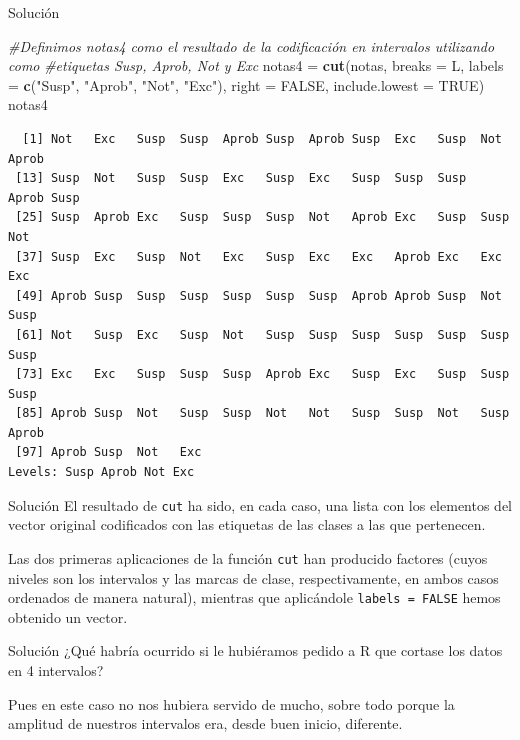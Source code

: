 \documentclass[
  ignorenonframetext,
]{beamer}
\newenvironment{Shaded}{\begin{snugshade}}{\end{snugshade}}
\newcommand{\AttributeTok}[1]{\textcolor[rgb]{0.13,0.29,0.53}{#1}}
\newcommand{\CommentTok}[1]{\textcolor[rgb]{0.56,0.35,0.01}{\textit{#1}}}
\newcommand{\ConstantTok}[1]{\textcolor[rgb]{0.56,0.35,0.01}{#1}}
\newcommand{\FunctionTok}[1]{\textcolor[rgb]{0.13,0.29,0.53}{\textbf{#1}}}
\newcommand{\NormalTok}[1]{#1}
\newcommand{\OtherTok}[1]{\textcolor[rgb]{0.56,0.35,0.01}{#1}}
\newcommand{\StringTok}[1]{\textcolor[rgb]{0.31,0.60,0.02}{#1}}
\begin{document}
\begin{frame}[fragile]{Solución}
\label{soluciuxf3n-20}
\begin{Shaded}
\begin{Highlighting}[]
\CommentTok{\#Definimos notas4 como el resultado de la codificación en intervalos utilizando como }
\CommentTok{\#etiquetas Susp, Aprob, Not y Exc}
\NormalTok{notas4 }\OtherTok{=} \FunctionTok{cut}\NormalTok{(notas, }\AttributeTok{breaks =}\NormalTok{ L, }\AttributeTok{labels =} \FunctionTok{c}\NormalTok{(}\StringTok{"Susp"}\NormalTok{, }\StringTok{"Aprob"}\NormalTok{, }\StringTok{"Not"}\NormalTok{, }\StringTok{"Exc"}\NormalTok{), }\AttributeTok{right =} \ConstantTok{FALSE}\NormalTok{, }\AttributeTok{include.lowest =} \ConstantTok{TRUE}\NormalTok{)}
\NormalTok{notas4}
\end{Highlighting}
\end{Shaded}

\begin{verbatim}
  [1] Not   Exc   Susp  Susp  Aprob Susp  Aprob Susp  Exc   Susp  Not   Aprob
 [13] Susp  Not   Susp  Susp  Exc   Susp  Exc   Susp  Susp  Susp  Aprob Susp 
 [25] Susp  Aprob Exc   Susp  Susp  Susp  Not   Aprob Exc   Susp  Susp  Not  
 [37] Susp  Exc   Susp  Not   Exc   Susp  Exc   Exc   Aprob Exc   Exc   Exc  
 [49] Aprob Susp  Susp  Susp  Susp  Susp  Susp  Aprob Aprob Susp  Not   Susp 
 [61] Not   Susp  Exc   Susp  Not   Susp  Susp  Susp  Susp  Susp  Susp  Susp 
 [73] Exc   Exc   Susp  Susp  Susp  Aprob Exc   Susp  Exc   Susp  Susp  Susp 
 [85] Aprob Susp  Not   Susp  Susp  Not   Not   Susp  Susp  Not   Susp  Aprob
 [97] Aprob Susp  Not   Exc  
Levels: Susp Aprob Not Exc
\end{verbatim}
\end{frame}

\begin{frame}[fragile]{Solución}
\label{soluciuxf3n-21}
El resultado de \texttt{cut} ha sido, en cada caso, una lista con los
elementos del vector original codificados con las etiquetas de las
clases a las que pertenecen.

Las dos primeras aplicaciones de la función \texttt{cut} han producido
factores (cuyos niveles son los intervalos y las marcas de clase,
respectivamente, en ambos casos ordenados de manera natural), mientras
que aplicándole \texttt{labels\ =\ FALSE} hemos obtenido un vector.
\end{frame}

\begin{frame}{Solución}
\label{soluciuxf3n-22}
¿Qué habría ocurrido si le hubiéramos pedido a R que cortase los datos
en 4 intervalos?

Pues en este caso no nos hubiera servido de mucho, sobre todo porque la
amplitud de nuestros intervalos era, desde buen inicio, diferente.
\end{frame}
\end{document}
